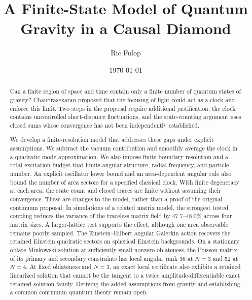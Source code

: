 \documentclass[onecolumn,11pt,aps,prd,amsmath,amssymb,nofootinbib,floatfix]{revtex4-2}
\begin{document}
\title{A Finite-State Model of Quantum Gravity in a Causal Diamond}

\author{Ric Fulop}
\date{\today}

\begin{abstract}
Can a finite region of space and time contain only a finite number of quantum states of gravity? Chandrasekaran proposed that the focusing of light could act as a clock and enforce this limit. Two steps in the proposal require additional justification: the clock contains uncontrolled short-distance fluctuations, and the state-counting argument uses closed sums whose convergence has not been independently established.

We develop a finite-resolution model that addresses these gaps under explicit assumptions. We subtract the vacuum contribution and smoothly average the clock in a quadratic mode approximation. We also impose finite boundary resolution and a total excitation budget that limits angular structure, radial frequency, and particle number. An explicit oscillator lower bound and an area-dependent angular rule also bound the number of area sectors for a specified classical clock. With finite degeneracy at each area, the state count and closed traces are finite without assuming their convergence. These are changes to the model, rather than a proof of the original continuum proposal. In simulations of a related matrix model, the strongest tested coupling reduces the variance of the traceless matrix field by 47.7--48.0\% across four matrix sizes. A larger-lattice test supports the effect, although one area observable remains poorly sampled. The Einstein--Hilbert angular Galerkin action recovers the retained Einstein quadratic sectors on spherical Einstein backgrounds. On a stationary oblate Minkowski solution at sufficiently small nonzero oblateness, the Poisson matrix of its primary and secondary constraints has local angular rank 36 at $N=3$ and 52 at $N=4$. At fixed oblateness and $N=3$, an exact local certificate also exhibits a retained linearized solution that cannot be the tangent to a twice amplitude-differentiable exact retained solution family. Deriving the added assumptions from gravity and establishing a common continuum quantum theory remain open.
\end{abstract}

\maketitle
\end{document}
